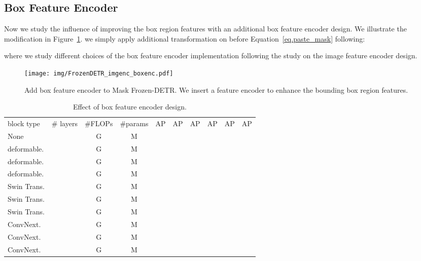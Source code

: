 \documentclass[10pt,twocolumn,letterpaper]{article}
\begin{document}
\subsection{Box Feature Encoder}
Now we study the influence of improving the box region features with an additional box feature encoder design.
We illustrate the modification in Figure~\ref{fig:frozen_detr_pipeline_3}.
we simply apply additional transformation  on  before Equation~\ref{eq.paste_mask} following:

where we study different choices of the box feature encoder implementation following the study on the image feature encoder design.

\begin{figure}[t]
\centering
\texttt{[image: img/FrozenDETR\_imgenc\_boxenc.pdf]}
\caption{\small{Add box feature encoder to Mask Frozen-DETR. We insert a feature encoder to enhance the bounding box region features.}}
\label{fig:frozen_detr_pipeline_3}
\end{figure}

\begin{table}[t]
\begin{minipage}[t]{1\linewidth}
\vspace{2mm}
\centering
\setlength{\tabcolsep}{1.2pt}
\footnotesize
\renewcommand{\arraystretch}{1.2}
\resizebox{1.0\linewidth}{!}
{
\begin{tabular}{l|c|c|c|cccccc}
block type & \# layers & \#FLOPs & \#params & AP & AP & AP & AP & AP & AP  \\
\shline
None &   &  G &  M &  &  &  &  &  &  \\\hline
deformable. &   &  G &  M &  &  &  &  &  &  \\
\rowcolor{gray!10}deformable. &   &  G &  M &  &  &  &  &  &  \\
deformable. &   & G &  M &  &  &  &  &  &  \\\hline
Swin Trans. &    &  G &  M &  &  &  &  &  &  \\
Swin Trans. &    &  G &  M &  &  &  &  &  &  \\
Swin Trans. &    &  G &  M &  &  &  &  &  &  \\\hline
ConvNext. &   &  G &  M &  &  &  &  &  &    \\
ConvNext. &   &  G &  M &  &  &  &  &  &   \\
ConvNext. &   &  G &  M &  &  &  &  &  &   \\
\end{tabular}
}
\caption{\small{{
Effect of box feature encoder design.}}
}
\label{tab:box_enc_ablate}
\end{minipage}
\end{table}
\end{document}
